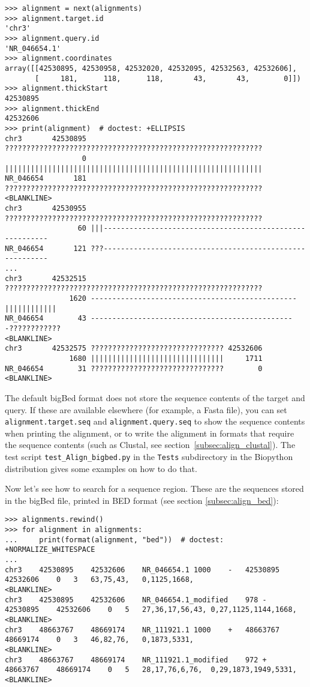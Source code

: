 \begin{verbatim}
>>> alignment = next(alignments)
>>> alignment.target.id
'chr3'
>>> alignment.query.id
'NR_046654.1'
>>> alignment.coordinates
array([[42530895, 42530958, 42532020, 42532095, 42532563, 42532606],
       [     181,      118,      118,       43,       43,        0]])
>>> alignment.thickStart
42530895
>>> alignment.thickEnd
42532606
>>> print(alignment)  # doctest: +ELLIPSIS
chr3       42530895 ????????????????????????????????????????????????????????????
                  0 ||||||||||||||||||||||||||||||||||||||||||||||||||||||||||||
NR_046654       181 ????????????????????????????????????????????????????????????
<BLANKLINE>
chr3       42530955 ????????????????????????????????????????????????????????????
                 60 |||---------------------------------------------------------
NR_046654       121 ???---------------------------------------------------------
...
chr3       42532515 ????????????????????????????????????????????????????????????
               1620 ------------------------------------------------||||||||||||
NR_046654        43 ------------------------------------------------????????????
<BLANKLINE>
chr3       42532575 ??????????????????????????????? 42532606
               1680 |||||||||||||||||||||||||||||||     1711
NR_046654        31 ???????????????????????????????        0
<BLANKLINE>
\end{verbatim}
The default bigBed format does not store the sequence contents of the target and query. If these are available elsewhere (for example, a Fasta file), you can set \verb|alignment.target.seq| and \verb|alignment.query.seq| to show the sequence contents when printing the alignment, or to write the alignment in formats that require the sequence contents (such as Clustal, see section~\ref{subsec:align_clustal}). The test script \verb|test_Align_bigbed.py| in the \verb|Tests| subdirectory in the Biopython distribution gives some examples on how to do that.

Now let's see how to search for a sequence region. These are the sequences stored in the bigBed file, printed in BED format (see section \ref{subsec:align_bed}):
\begin{verbatim}
>>> alignments.rewind()
>>> for alignment in alignments:
...     print(format(alignment, "bed"))  # doctest: +NORMALIZE_WHITESPACE
...
chr3	42530895	42532606	NR_046654.1	1000	-	42530895	42532606	0	3	63,75,43,	0,1125,1668,
<BLANKLINE>
chr3	42530895	42532606	NR_046654.1_modified	978	-	42530895	42532606	0	5	27,36,17,56,43,	0,27,1125,1144,1668,
<BLANKLINE>
chr3	48663767	48669174	NR_111921.1	1000	+	48663767	48669174	0	3	46,82,76,	0,1873,5331,
<BLANKLINE>
chr3	48663767	48669174	NR_111921.1_modified	972	+	48663767	48669174	0	5	28,17,76,6,76,	0,29,1873,1949,5331,
<BLANKLINE>
\end{verbatim}

